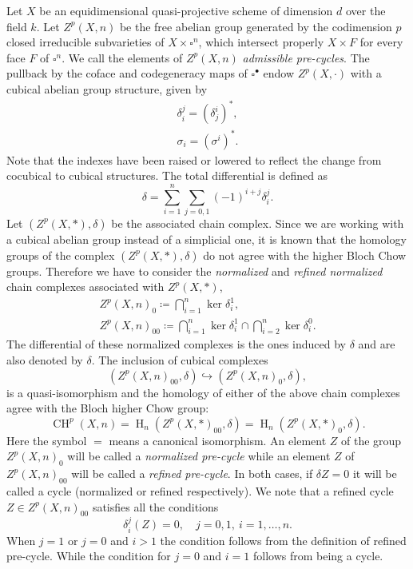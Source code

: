 \documentclass[11pt,a4paper]{amsart}
\DeclareMathOperator {\CH}{CH}
\DeclareMathOperator{\rH}{H}
\numberwithin{equation}{section}
\theoremstyle{plain}
\theoremstyle{definition}
\begin{document}
Let $X$ be an equidimensional quasi-projective scheme of
dimension $d$ over the field $k$. Let $Z^{p}(X,n)$ be the free
abelian group generated by the codimension $p$ closed irreducible
subvarieties of $X\times \square^{n}$, which intersect properly
$X\times F$ for every face $F$
of $\square^n$. We call the elements of $Z^p(X,n)$
\textit{admissible pre-cycles}. 
The pullback by the coface and codegeneracy maps of $\square^{\bullet}$
endow $Z^{p}(X,\cdot)$ with a cubical abelian group structure, given by
\begin{displaymath}
\begin{gathered}
  \delta ^{j}_{i}=(\delta ^{i}_{j})^{\ast},\\
  \sigma _{i}=(\sigma ^{i})^{ \ast}.
\end{gathered}
\end{displaymath}
Note that the indexes have been raised or lowered to reflect the change from
cocubical to cubical structures. The total differential is defined as
\begin{displaymath}
    \delta= \sum_{i=1}^n \sum_{j=0,1}(-1)^{i+j}\delta_i^j.
\end{displaymath}
Let
$(Z^{p}(X,*),\delta)$ be the associated chain complex. Since we are
working with a cubical abelian group instead of a simplicial one, it
is known that the homology groups of the complex $(Z^{p}(X,*),\delta)$
do not agree with the higher Bloch Chow groups. Therefore we have to 
consider the \emph{normalized} and \emph{refined normalized} chain
complexes associated with $Z^p(X,*)$, 
 \begin{eqnarray*}
Z^{p}(X,n)_{0}\coloneqq \bigcap_{i=1}^{n} \ker
\delta^1_i,\\
Z^p(X,n)_{00} \coloneqq \bigcap_{i=1}^{n} \ker \delta^1_i\cap
\bigcap_{i=2}^{n} \ker \delta^0_i.
\end{eqnarray*}
The differential of these normalized complexes is the ones induced by
$\delta $  and are also denoted by $\delta$.
 The inclusion of cubical complexes
\begin{displaymath}
(Z^{p}(X,n)_{00}, \delta)\hookrightarrow (Z^{p}(X,n)_{0},\delta),
\end{displaymath}
is a quasi-isomorphism and the homology of either of the above chain
complexes agree with the Bloch higher Chow group:
\begin{displaymath}
\CH^{p}(X,n)= \rH_{n}(Z^{p}(X,\ast)_{00},\delta)= \rH_{n}(Z^{p}(X,\ast)_{0},\delta).
\end{displaymath}
Here the symbol $=$ means a canonical isomorphism. An element $Z$ of
the group $Z^{p}(X,n)_{0}$ will be called a \emph{normalized pre-cycle} while an
element $Z$ of $Z^{p}(X,n)_{00}$ will be called a \emph{refined
  pre-cycle}. In both cases, if $\delta Z=0$ it will be called a cycle
(normalized or refined respectively).  We note that a refined cycle
$Z\in Z^{p}(X,n)_{00}$ satisfies all the conditions
\begin{displaymath}
  \delta ^{j}_{i}(Z)=0,\quad j=0,1,  \ i=1,\dots,n.
\end{displaymath}
When $j=1$ or $j=0$ and $i>1$ the condition follows from the
definition of refined pre-cycle. While the condition for $j=0$ and
$i=1$ follows from being a cycle. 
\end{document}

